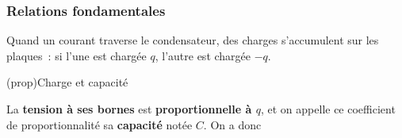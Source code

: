 \documentclass[../../main/main.tex]{subfiles}
\begin{document}
\subsubsection{Relations fondamentales}
Quand un courant traverse le condensateur, des charges s'accumulent sur
les plaques~: si l'une est chargée $q$, l'autre est chargée $-q$.
\begin{tcb}[label=prop:Ccondens, sidebyside, righthand ratio=.3](prop){Charge et capacité}
	\begin{isd}[righthand ratio=.3, sidebyside align=top]
		La \textbf{tension à ses bornes} est \textbf{proportionnelle à $q$}, et on
		appelle ce coefficient de proportionnalité sa \textbf{capacité} notée $C$.
		On a donc
		\psw{
			\[\boxed{q = Cu}\]
		}
		\vspace*{-15pt}
		\tcblower
		\vspace{-15pt}
	\end{isd}
	\tcblower
	\begin{center}
	\end{center}
\end{tcb}
\end{document}
